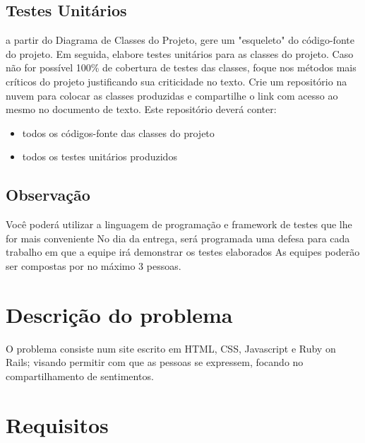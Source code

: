 \documentclass[12pt]{article}
\begin{document}
\subsection{Testes Unitários}
a partir do Diagrama de Classes do Projeto, gere um "esqueleto" do código-fonte do projeto. Em seguida, elabore testes unitários para as classes do projeto. Caso não for possível 100\% de cobertura de testes das classes, foque nos métodos mais críticos do projeto justificando sua criticidade no texto. Crie um repositório na nuvem para colocar as classes produzidas e compartilhe o link com acesso ao mesmo no documento de texto. Este repositório deverá conter:
\begin{itemize}
  \item todos os códigos-fonte das classes do projeto
  \item todos os testes unitários produzidos
\end{itemize}
\subsection{Observação} 
Você poderá utilizar a linguagem de programação e framework de testes que lhe for mais conveniente
No dia da entrega, será programada uma defesa para cada trabalho em que a equipe irá demonstrar os testes elaborados
As equipes poderão ser compostas por no máximo 3 pessoas.

\section{Descrição do problema} \label{sec:firstpage}
O problema consiste num site escrito em HTML, CSS, Javascript e Ruby on Rails; 
visando permitir com que as pessoas se expressem, focando no compartilhamento 
de sentimentos.

\section{Requisitos}
\end{document}
